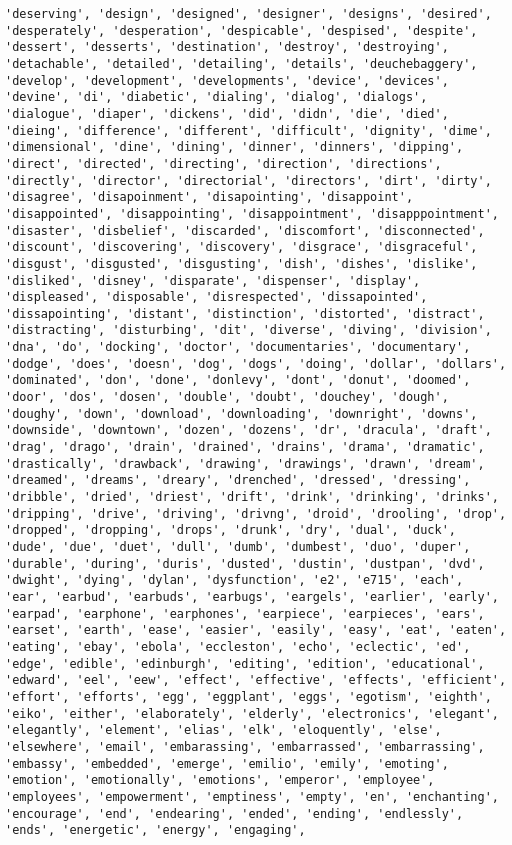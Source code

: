 \documentclass[11pt]{article}
\begin{document}
\begin{Verbatim}[commandchars=\\\{\}]
'deserving', 'design', 'designed', 'designer', 'designs', 'desired', 'desperately', 'desperation', 'despicable', 'despised', 'despite', 'dessert', 'desserts', 'destination', 'destroy', 'destroying', 'detachable', 'detailed', 'detailing', 'details', 'deuchebaggery', 'develop', 'development', 'developments', 'device', 'devices', 'devine', 'di', 'diabetic', 'dialing', 'dialog', 'dialogs', 'dialogue', 'diaper', 'dickens', 'did', 'didn', 'die', 'died', 'dieing', 'difference', 'different', 'difficult', 'dignity', 'dime', 'dimensional', 'dine', 'dining', 'dinner', 'dinners', 'dipping', 'direct', 'directed', 'directing', 'direction', 'directions', 'directly', 'director', 'directorial', 'directors', 'dirt', 'dirty', 'disagree', 'disapoinment', 'disapointing', 'disappoint', 'disappointed', 'disappointing', 'disappointment', 'disapppointment', 'disaster', 'disbelief', 'discarded', 'discomfort', 'disconnected', 'discount', 'discovering', 'discovery', 'disgrace', 'disgraceful', 'disgust', 'disgusted', 'disgusting', 'dish', 'dishes', 'dislike', 'disliked', 'disney', 'disparate', 'dispenser', 'display', 'displeased', 'disposable', 'disrespected', 'dissapointed', 'dissapointing', 'distant', 'distinction', 'distorted', 'distract', 'distracting', 'disturbing', 'dit', 'diverse', 'diving', 'division', 'dna', 'do', 'docking', 'doctor', 'documentaries', 'documentary', 'dodge', 'does', 'doesn', 'dog', 'dogs', 'doing', 'dollar', 'dollars', 'dominated', 'don', 'done', 'donlevy', 'dont', 'donut', 'doomed', 'door', 'dos', 'dosen', 'double', 'doubt', 'douchey', 'dough', 'doughy', 'down', 'download', 'downloading', 'downright', 'downs', 'downside', 'downtown', 'dozen', 'dozens', 'dr', 'dracula', 'draft', 'drag', 'drago', 'drain', 'drained', 'drains', 'drama', 'dramatic', 'drastically', 'drawback', 'drawing', 'drawings', 'drawn', 'dream', 'dreamed', 'dreams', 'dreary', 'drenched', 'dressed', 'dressing', 'dribble', 'dried', 'driest', 'drift', 'drink', 'drinking', 'drinks', 'dripping', 'drive', 'driving', 'drivng', 'droid', 'drooling', 'drop', 'dropped', 'dropping', 'drops', 'drunk', 'dry', 'dual', 'duck', 'dude', 'due', 'duet', 'dull', 'dumb', 'dumbest', 'duo', 'duper', 'durable', 'during', 'duris', 'dusted', 'dustin', 'dustpan', 'dvd', 'dwight', 'dying', 'dylan', 'dysfunction', 'e2', 'e715', 'each', 'ear', 'earbud', 'earbuds', 'earbugs', 'eargels', 'earlier', 'early', 'earpad', 'earphone', 'earphones', 'earpiece', 'earpieces', 'ears', 'earset', 'earth', 'ease', 'easier', 'easily', 'easy', 'eat', 'eaten', 'eating', 'ebay', 'ebola', 'eccleston', 'echo', 'eclectic', 'ed', 'edge', 'edible', 'edinburgh', 'editing', 'edition', 'educational', 'edward', 'eel', 'eew', 'effect', 'effective', 'effects', 'efficient', 'effort', 'efforts', 'egg', 'eggplant', 'eggs', 'egotism', 'eighth', 'eiko', 'either', 'elaborately', 'elderly', 'electronics', 'elegant', 'elegantly', 'element', 'elias', 'elk', 'eloquently', 'else', 'elsewhere', 'email', 'embarassing', 'embarrassed', 'embarrassing', 'embassy', 'embedded', 'emerge', 'emilio', 'emily', 'emoting', 'emotion', 'emotionally', 'emotions', 'emperor', 'employee', 'employees', 'empowerment', 'emptiness', 'empty', 'en', 'enchanting', 'encourage', 'end', 'endearing', 'ended', 'ending', 'endlessly', 'ends', 'energetic', 'energy', 'engaging', 
\end{Verbatim}
\end{document}
